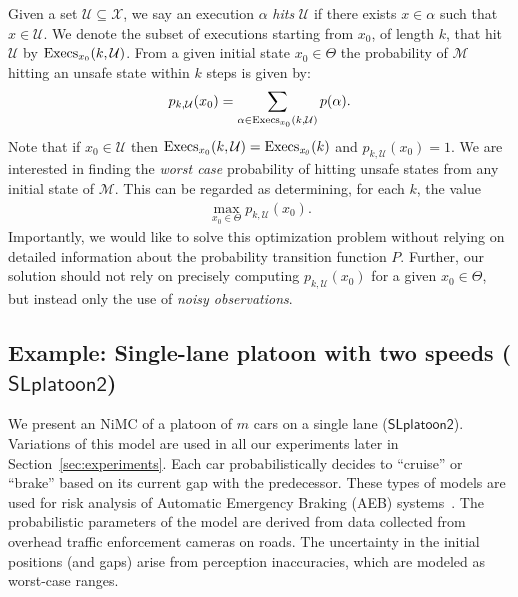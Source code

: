 \documentclass[11pt]{article}
\theoremstyle{definition}
\newcommand{\sayan}[1]{\textcolor{blue}{#1}}
\newcommand{\geir}[1]{\textcolor{red}{#1}}
\newcommand{\M}{\mathcal{M}}
\newcommand{\X}{\mathcal{X}}
\newcommand{\phit}[3]{{p_{#1,#2}{(#3)}}}
\newcommand{\Unsafe}{\mathcal{U}}
\newcommand{\uthresh}{\eta}
\newcommand{\modelname}{NiMC\xspace}
\newcommand{\execs}[1]{{{\rm{Execs}}_{#1}}}
\newcommand{\SlplatoonTwo}{{$\mathsf{SLplatoon2}$\xspace}}
\begin{document}
Given a set $\Unsafe \subseteq \X$, we say an execution $\alpha$ \emph{hits} $\Unsafe$ if there exists $x\in \alpha$ such that $x\in\Unsafe$. We denote the subset of executions starting from $x_0$, of length $k$,  that hit $\Unsafe$ by $\execs{x_0}(k, \Unsafe)$.
From a given  initial state $x_0 \in \Theta$ the probability of $\M$ hitting an unsafe state within $k$ steps is given by:
\begin{align}
 \phit{k}{\Unsafe}{x_0} = \sum_{\alpha \in \execs{x_0}( k, \Unsafe)} p(\alpha).
 \label{eq:sumexecs}
\end{align}
Note that if $x_0\in\Unsafe$ then $\execs{x_0}( k, \Unsafe)=\execs{\mathit{x_0}}(k)$  and $\phit{k}{\Unsafe}{x_0}=1$.
%
We are interested in finding the {\em worst case} probability of hitting unsafe states from any initial state of $\M$. This can be regarded as determining, for each $k$, the value
\begin{align}
    \label{eq:SMCproblem}
\max_{x_0 \in \Theta} \phit{k}{\Unsafe}{x_0} .
\end{align}
%
Importantly, we would like to solve this optimization problem without  relying on detailed information about the probability transition function $P$. Further, our solution should not rely on precisely computing $\phit{k}{\Unsafe}{x_0}$ for a given $x_0 \in \Theta$, but instead only the use of {\em noisy observations\/}.



\subsection{Example: Single-lane platoon with two speeds (\SlplatoonTwo)}
\label{example1}
We present an \modelname of a  platoon of $m$ cars on a single lane (\SlplatoonTwo). Variations of this model are used in all our experiments later in Section~\ref{sec:experiments}. Each car probabilistically decides to ``cruise'' or ``brake'' based on its current gap with the predecessor.
These types of models are used for risk analysis of Automatic Emergency Braking (AEB) systems~\cite{simonepresent,FanQM18}.
%
The probabilistic parameters of the model are derived from data collected from overhead traffic enforcement cameras on roads. The uncertainty in the initial positions (and gaps) arise from perception inaccuracies, which are modeled as worst-case ranges.
\end{document}
